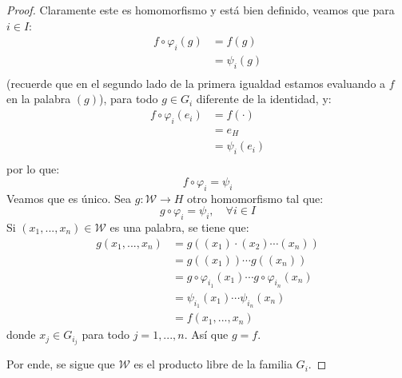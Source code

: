 \documentclass[12pt]{report}
\theoremstyle{largebreak}
\newcommand\cf[3]{\ensuremath{#1:#2\rightarrow#3}}
\begin{document}
\begin{proof}
        Claramente este es homomorfismo y está bien definido, veamos que para $i\in I$:
        \begin{equation*}
            \begin{split}
                f\circ\varphi_i(g)&=f(g)\\
                &=\psi_i(g)\\
            \end{split}
        \end{equation*}
        (recuerde que en el segundo lado de la primera igualdad estamos evaluando a $f$ en la palabra $(g)$), para todo $g\in G_i$ diferente de la identidad, y:
        \begin{equation*}
            \begin{split}
                f\circ\varphi_i(e_i)&=f(\cdot)\\
                &=e_H\\
                &=\psi_i(e_i)\\
            \end{split}
        \end{equation*}
        por lo que:
        \begin{equation*}
            f\circ\varphi_i=\psi_i
        \end{equation*}
        Veamos que es único. Sea $\cf{g}{\mathscr{W}}{H}$ otro homomorfismo tal que:
        \begin{equation*}
            g\circ\varphi_i=\psi_i,\quad\forall i\in I
        \end{equation*}
        Si $(x_1,...,x_n)\in\mathscr{W}$ es una palabra, se tiene que:
        \begin{equation*}
            \begin{split}
                g(x_1,...,x_n)&=g((x_1)\cdot(x_2)\cdots(x_n))\\
                &=g((x_1))\cdots g((x_n))\\
                &=g\circ\varphi_{i_1}(x_1)\cdots g\circ\varphi_{i_n}(x_n)\\
                &=\psi_{ i_1}(x_1)\cdots\psi_{ i_n}(x_n)\\
                &=f(x_1,...,x_n)
            \end{split}
        \end{equation*}
        donde $x_j\in G_{ i_j}$ para todo $j=1,...,n$. Así que $g=f$.

        Por ende, se sigue que $\mathscr{W}$ es el producto libre de la familia $G_i$.
    \end{proof}
\end{document}
